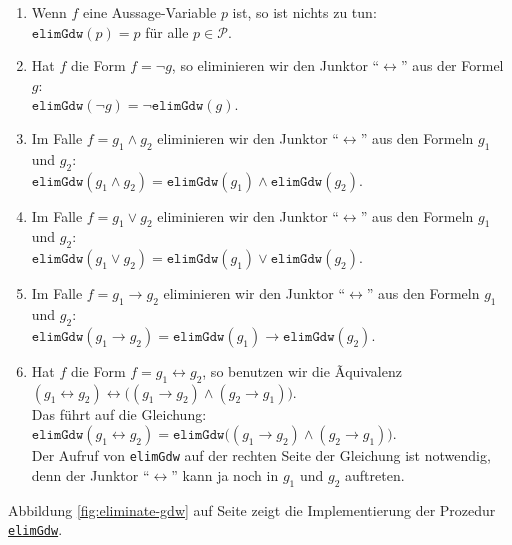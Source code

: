 \begin{enumerate}
\item Wenn $f$ eine
      Aussage-Variable $p$ ist, so ist nichts zu tun:
      \\[0.2cm]
      \hspace*{1.3cm}
      $\mathtt{elimGdw}(p) = p$ \quad f\"{u}r alle $p \in \mathcal{P}$.
\item Hat $f$ die Form $f = \neg g$, so eliminieren wir den Junktor
      ``$\leftrightarrow$'' aus der Formel $g$: \\[0.2cm]
      \hspace*{1.3cm} 
      $\mathtt{elimGdw}(\neg g) = \neg \mathtt{elimGdw}(g)$.
\item Im Falle $f = g_1 \wedge g_2$ eliminieren wir den Junktor
      ``$\leftrightarrow$'' aus den Formeln $g_1$ und $g_2$: \\[0.2cm]
      \hspace*{1.3cm} 
      $\mathtt{elimGdw}(g_1 \wedge g_2) = \mathtt{elimGdw}(g_1) \wedge \mathtt{elimGdw}(g_2)$.
\item Im Falle $f = g_1 \vee g_2$ eliminieren wir den Junktor
      ``$\leftrightarrow$'' aus den Formeln $g_1$ und $g_2$: \\[0.2cm]
      \hspace*{1.3cm} 
      $\mathtt{elimGdw}(g_1 \vee g_2) = \mathtt{elimGdw}(g_1) \vee \mathtt{elimGdw}(g_2)$.
\item Im Falle $f = g_1 \rightarrow g_2$ eliminieren wir den Junktor
      ``$\leftrightarrow$'' aus den Formeln $g_1$ und $g_2$: \\[0.2cm]
      \hspace*{1.3cm} 
      $\mathtt{elimGdw}(g_1 \rightarrow g_2) = \mathtt{elimGdw}(g_1) \rightarrow \mathtt{elimGdw}(g_2)$.
\item Hat $f$ die Form $f = g_1 \leftrightarrow g_2$, so benutzen wir die
      Ãquivalenz \\[0.2cm]
      \hspace*{1.3cm} 
      $(g_1 \leftrightarrow g_2) \leftrightarrow \bigl( (g_1 \rightarrow g_2) \wedge (g_2 \rightarrow g_1)\bigr)$.
      \\[0.2cm]
      Das f\"{u}hrt auf die Gleichung:
      \\[0.2cm]
      \hspace*{1.3cm} 
      $\mathtt{elimGdw}(g_1 \leftrightarrow g_2) = \mathtt{elimGdw}\bigl( (g_1 \rightarrow g_2) \wedge (g_2 \rightarrow g_1)\bigr)$. 
      \\[0.2cm]
      Der Aufruf von \texttt{elimGdw} auf der rechten Seite der Gleichung ist notwendig,
      denn der Junktor ``$\leftrightarrow$'' kann ja noch in $g_1$ und $g_2$ auftreten.
\end{enumerate}
Abbildung
\ref{fig:eliminate-gdw} auf Seite \pageref{fig:eliminate-gdw} zeigt die Implementierung der
Prozedur 
\href{https://github.com/karlstroetmann/Logik/blob/master/SetlX/knf.stlx}{\texttt{elimGdw}}.

